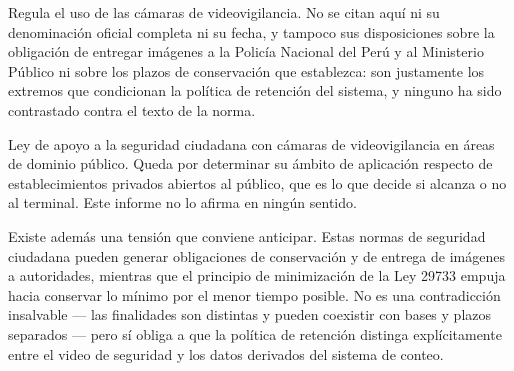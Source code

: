 \begin{description}[leftmargin=0pt,style=unboxed,itemsep=0.4em]
  \item[Decreto Legislativo 1218.] Regula el uso de las cámaras de
    videovigilancia. No se citan aquí ni su denominación oficial completa
    ni su fecha, y tampoco sus disposiciones sobre la obligación de
    entregar imágenes a la Policía Nacional del Perú y al Ministerio
    Público ni sobre los plazos de conservación que establezca: son
    justamente los extremos que condicionan la política de retención del
    sistema, y ninguno ha sido contrastado contra el texto de la norma.
  \item[Ley 30120.] Ley de apoyo a la seguridad ciudadana con cámaras de
    videovigilancia en áreas de dominio público. Queda por determinar su
    ámbito de aplicación respecto de establecimientos privados abiertos
    al público, que es lo que decide si alcanza o no al terminal. Este
    informe no lo afirma en ningún sentido.
\end{description}


Existe además una tensión que conviene anticipar. Estas normas de
seguridad ciudadana pueden generar obligaciones de conservación y de
entrega de imágenes a autoridades, mientras que el principio de
minimización de la Ley 29733 empuja hacia conservar lo mínimo por el
menor tiempo posible. No es una contradicción insalvable --- las
finalidades son distintas y pueden coexistir con bases y plazos separados
--- pero sí obliga a que la política de retención distinga explícitamente
entre el video de seguridad y los datos derivados del sistema de conteo.

